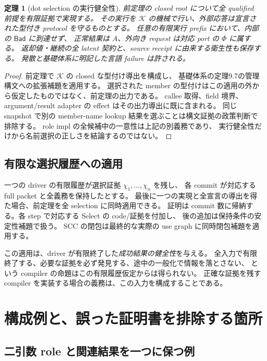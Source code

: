 \documentclass[11pt,a4paper]{article}
\newtheorem{theorem}[definition]{定理}
\newcommand{\Core}{\mathcal K}
\begin{document}
\begin{theorem}[dot selection の実行健全性]
\label{thm:safety}
前定理の closed root について全 qualified 前提を有限証拠で実現する。
その実行を \(\Core\) の機械で行い、外部応答は宣言された型付き protocol を守るものとする。
任意の有限実行 prefix において、内部の \(\mathsf{Bad}\) に到達せず、
正常結果は \(A\)、外向き request は対応 port の \(\Phi\) に属する。
返却値・継続の全 latent 契約と、source receipt に由来する衛生性も保存する。
発散と基礎体系に明記した言語 failure は許される。
\end{theorem}
\begin{proof}
前定理で \(\Core\) の closed な型付け導出を構成し、
基礎体系の定理9.7の管理構文への拡張補題を適用する。
選択された member の型付けはこの適用の外から仮定したものではなく、前定理の出力である。
callee 取得、field 境界、argument/result adapter の effect はその出力導出に既に含まれる。
同じ snapshot で別の member-name lookup 結果を選ぶことは構文証拠の政策判断で排除する。
role impl の全候補中の一意性は上記の別義務であり、
実行健全性だけから名前選択の正しさを結論するのではない。
\end{proof}

\subsection{有限な選択履歴への適用}

一つの driver の有限履歴が選択証拠 \(\chi_1,\ldots,\chi_n\) を残し、
各 commit が対応する full packet と全義務を保持したとする。
最後に一つの実現と全宣言の導出を得た場合、前定理を全 selection に同時適用できる。
証明は commit 数に帰納する。各 step で対応する Select の code/証拠を付加し、
後の追加は保持条件の安定性補題で扱う。
SCC の閉包は最終的な実際の use graph に同時閉包補題を適用する。

この適用は、driver が有限終了した\emph{成功結果の健全性}を与える。
全入力で有限終了する、必要な証拠を必ず発見する、途中の一般化で情報を落とさない、
という compiler の命題はこの有限履歴仮定からは得られない。
正確な証拠を残す compiler を実装する場合の義務は、この入力を構成することである。

\section{構成例と、誤った証明書を排除する箇所}
\label{sec:examples}

\subsection{二引数 role と関連結果を一つに保つ例}
\end{document}
